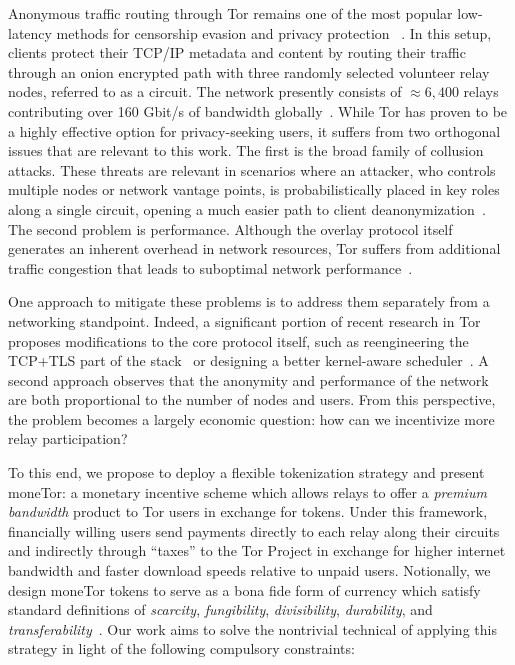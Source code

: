 Anonymous traffic routing through Tor remains one of the most popular
low-latency methods for censorship evasion and privacy protection
~\cite{dingledine2004tor}. In this setup, clients protect their TCP/IP metadata
and content by routing their traffic through an onion encrypted path with three
randomly selected volunteer relay nodes, referred to as a circuit. The network
presently consists of $\approx 6,400$ relays contributing over 160 Gbit/s of
bandwidth globally~\cite{portal2018tormetrics}. While Tor has proven to be a
highly effective option for privacy-seeking users, it suffers from two
orthogonal issues that are relevant to this work. The first is the broad family
of collusion attacks. These threats are relevant in scenarios where an attacker,
who controls multiple nodes or network vantage points, is probabilistically
placed in key roles along a single circuit, opening a much easier path to client
deanonymization~\cite{wright2004predecessor,murdoch2005low}. The second problem
is performance. Although the overlay protocol itself generates an inherent
overhead in network resources, Tor suffers from additional traffic congestion
that leads to suboptimal network performance~\cite{portal2018tormetrics,
  alsabah2016performance}.

One approach to mitigate these problems is to address them separately from a
networking standpoint. Indeed, a significant portion of recent research in Tor
proposes modifications to the core protocol itself, such as reengineering the
TCP+TLS part of the stack~\cite{reardon2009improving} or designing a better
kernel-aware scheduler~\cite{jansen2014never}. A second approach observes that
the anonymity and performance of the network are both proportional to the number
of nodes and users. From this perspective, the problem becomes a largely
economic question: how can we incentivize more relay participation?

To this end, we propose to deploy a flexible tokenization strategy and present
moneTor: a monetary incentive scheme which allows relays to offer a
\emph{premium bandwidth} product to Tor users in exchange for tokens. Under this
framework, financially willing users send payments directly to each relay along
their circuits and indirectly through ``taxes'' to the Tor Project in exchange
for higher internet bandwidth and faster download speeds relative to unpaid
users. Notionally, we design moneTor tokens to serve as a bona fide form of
currency which satisfy standard definitions of \textit{scarcity},
\textit{fungibility}, \textit{divisibility}, \textit{durability}, and
\textit{transferability}~\cite[p.3]{crump2011phenomenon}. Our work aims to solve
the nontrivial technical of applying this strategy in light of the following
compulsory constraints:


